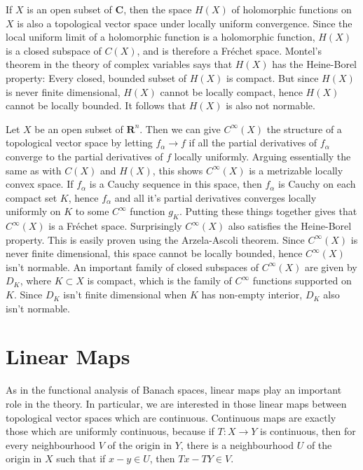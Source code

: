 \begin{example}
    If $X$ is an open subset of $\mathbf{C}$, then the space $H(X)$ of holomorphic functions on $X$ is also a topological vector space under locally uniform convergence. Since the local uniform limit of a holomorphic function is a holomorphic function, $H(X)$ is a closed subspace of $C(X)$, and is therefore a Fr\'{e}chet space. Montel's theorem in the theory of complex variables says that $H(X)$ has the Heine-Borel property: Every closed, bounded subset of $H(X)$ is compact. But since $H(X)$ is never finite dimensional, $H(X)$ cannot be locally compact, hence $H(X)$ cannot be locally bounded. It follows that $H(X)$ is also not normable.
\end{example}

\begin{example}
    Let $X$ be an open subset of $\mathbf{R}^n$. Then we can give $C^\infty(X)$ the structure of a topological vector space by letting $f_\alpha \to f$ if all the partial derivatives of $f_\alpha$ converge to the partial derivatives of $f$ locally uniformly. Arguing essentially the same as with $C(X)$ and $H(X)$, this shows $C^\infty(X)$ is a metrizable locally convex space. If $f_\alpha$ is a Cauchy sequence in this space, then $f_\alpha$ is Cauchy on each compact set $K$, hence $f_\alpha$ and all it's partial derivatives converges locally uniformly on $K$ to some $C^\infty$ function $g_K$. Putting these things together gives that $C^\infty(X)$ is a Fr\'{e}chet space. Surprisingly $C^\infty(X)$ also satisfies the Heine-Borel property. This is easily proven using the Arzela-Ascoli theorem. Since $C^\infty(X)$ is never finite dimensional, this space cannot be locally bounded, hence $C^\infty(X)$ isn't normable. An important family of closed subspaces of $C^\infty(X)$ are given by $D_K$, where $K \subset X$ is compact, which is the family of $C^\infty$ functions supported on $K$. Since $D_K$ isn't finite dimensional when $K$ has non-empty interior, $D_K$ also isn't normable.
\end{example}



\section{Linear Maps}

As in the functional analysis of Banach spaces, linear maps play an important role in the theory. In particular, we are interested in those linear maps between topological vector spaces which are continuous. Continuous maps are exactly those which are uniformly continuous, because if $T: X \to Y$ is continuous, then for every neighbourhood $V$ of the origin in $Y$, there is a neighbourhood $U$ of the origin in $X$ such that if $x - y \in U$, then $Tx - TY \in V$.

